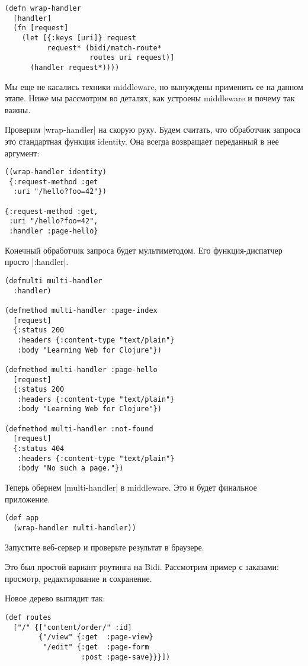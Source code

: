 \begin{verbatim}
(defn wrap-handler
  [handler]
  (fn [request]
    (let [{:keys [uri]} request
          request* (bidi/match-route*
                    routes uri request)]
      (handler request*))))
\end{verbatim}

Мы еще не касались техники middleware, но вынуждены применить ее на данном
этапе.  Ниже мы рассмотрим во деталях, как устроены middleware и почему так
важны.

Проверим \spverb|wrap-handler| на скорую руку. Будем считать, что обработчик запроса
это стандартная функция identity. Она всегда возвращает переданный в нее
аргумент:

\begin{verbatim}
((wrap-handler identity)
 {:request-method :get
  :uri "/hello?foo=42"})

{:request-method :get,
 :uri "/hello?foo=42",
 :handler :page-hello}
\end{verbatim}

Конечный обработчик запроса будет мультиметодом. Его функция-диспатчер просто
\spverb|:handler|.

\begin{verbatim}
(defmulti multi-handler
  :handler)

(defmethod multi-handler :page-index
  [request]
  {:status 200
   :headers {:content-type "text/plain"}
   :body "Learning Web for Clojure"})

(defmethod multi-handler :page-hello
  [request]
  {:status 200
   :headers {:content-type "text/plain"}
   :body "Learning Web for Clojure"})

(defmethod multi-handler :not-found
  [request]
  {:status 404
   :headers {:content-type "text/plain"}
   :body "No such a page."})
\end{verbatim}

Теперь обернем \spverb|multi-handler| в middleware. Это и будет финальное приложение.

\begin{verbatim}
(def app
  (wrap-handler multi-handler))
\end{verbatim}

Запустите веб-сервер и проверьте результат в браузере.

Это был простой вариант роутинга на Bidi. Рассмотрим пример с заказами:
просмотр, редактирование и сохранение.

Новое дерево выглядит так:

\begin{verbatim}
(def routes
  ["/" {["content/order/" :id]
        {"/view" {:get  :page-view}
         "/edit" {:get  :page-form
                  :post :page-save}}}])
\end{verbatim}

